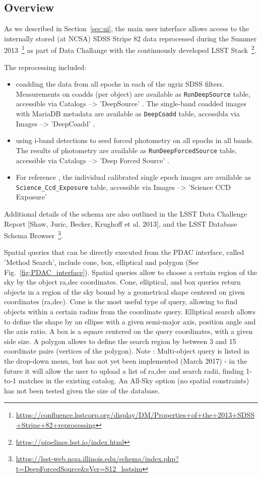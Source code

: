 \documentclass[DM,lsstdraft,toc,usenatbib]{lsstdoc}
\begin{document}
\subsection{Overview}


As we described in Section~\ref{sec:ui}, the main user interface allows access to the internally stored (at NCSA) SDSS Stripe 82 data reprocessed during the Summer 2013~\footnote{\url{https://confluence.lsstcorp.org/display/DM/Properties+of+the+2013+SDSS+Stripe+82+reprocessing}} as part of Data Challange with the continuously developed LSST Stack~\footnote{\url{https://pipelines.lsst.io/index.html}}. 

The reprocessing included: 
\begin{itemize}
\item coadding the data from all epochs in each of the ugriz SDSS filters. Measurements on coadds (per object) are available as  \verb|RunDeepSource| table, accessible via Catalogs -->   'DeepSource' .  The single-band coadded images with MariaDB metadata are available as \verb|DeepCoadd| table, accessibla via Images -->  'DeepCoadd' . 
\item using i-band detections to seed forced photometry on all epochs in all bands. The results of photometry are available as \verb|RunDeepForcedSource| table, accessible via  Catalogs --> 'Deep Forced Source' .  
\item For reference , the individual calibrated single epoch images are available as \verb|Science_Ccd_Exposure| table, accessible via Images --> 'Science CCD Exposure'   
\end{itemize}

Additional details of the schema are also outlined in the LSST Data Challenge Report [Shaw, Juric, Becker, Krughoff et al. 2013], and the LSST Database Schema Browser~\footnote{\url{https://lsst-web.ncsa.illinois.edu/schema/index.php?t=DeepForcedSource&sVer=S12_lsstsim}}. 


Spatial queries that can be directly executed from the PDAC interface, called 'Method Search',  include cone, box, elliptical and polygon (See Fig.~\ref{fig:PDAC_interface}).  Spatial queries allow to choose a certain region of the sky by the object ra,dec coordinates.  
Cone, elliptical, and box queries  return objects in a region of the sky bound by a geometrical shape centered on given coordinates (ra,dec). Cone is the most useful type of query, allowing to find objects within a certain radius from the coordinate query.  Elliptical search allows to define the shape by an ellipse with a given semi-major axis,  position angle and the axis ratio. A box is a square centered on the query coordinates, with a given side size.  A polygon allows to define the search region by between 3 and 15 coordinate pairs (vertices of the polygon). Note : Multi-object query is listed in the drop-down menu, but has not yet been implemented (March 2017) - in the future it will allow the user to upload a list of ra,dec and search radii,  finding 1-to-1 matches in the existing catalog. An All-Sky option (no spatial constraints) has not been tested given the size of the database.  
\end{document}
